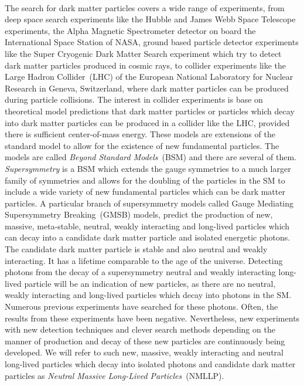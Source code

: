 \paragraph*{}%
The search for dark matter particles covers a wide range of experiments, from deep space search experiments like the Hubble and James Webb Space Telescope experiments, the Alpha Magnetic Spectrometer detector on board the International Space Station of NASA, ground based particle detector experiments like the Super Cryogenic Dark Matter Search experiment which try to detect dark matter particles produced in cosmic rays, to collider experiments like the Large Hadron Collider~(LHC) of the European National Laboratory for Nuclear Research in Geneva, Switzerland, where dark matter particles can be produced during particle collisions.
The interest in collider experiments is base on theoretical model predictions that dark matter particles or particles which decay into dark matter particles can be produced in a collider like the LHC, provided there is sufficient center-of-mass energy. These models are extensions of the standard model to allow for the existence of new fundamental particles. The models are called \textit{Beyond Standard Models}~(BSM) and there are several of them. \textit{Supersymmetry} is a BSM which extends the gauge symmetries to a much larger family of symmetries and allows for the doubling of the particles in the SM to include a wide variety of new fundamental particles which can be dark matter particles\cite{SUSYDM,LSPDM}. A particular branch of supersymmetry models called Gauge Mediating Supersymmetry Breaking~(GMSB) models, predict the production of new, massive, meta-stable, neutral, weakly interacting and long-lived particles which can decay into a candidate dark matter particle and isolated energetic photons. The candidate dark matter particle is stable and also neutral and weakly interacting. It has a lifetime comparable to the age of the universe. Detecting photons from the decay of a supersymmetry neutral and weakly interacting long-lived particle will be an indication of new particles, as there are no neutral, weakly interacting and long-lived particles which decay into photons in the SM. Numerous previous experiments have searched for these photons. Often, the results from these experiments have been negative. Nevertheless, new experiments with new detection techniques and clever search methods depending on the manner of production and decay of these new particles are continuously being developed. 
We will refer to such new, massive, weakly interacting and neutral long-lived particles which decay into isolated photons and candidate dark matter particles  as \textit{Neutral Massive Long-Lived Particles}~(NMLLP).

